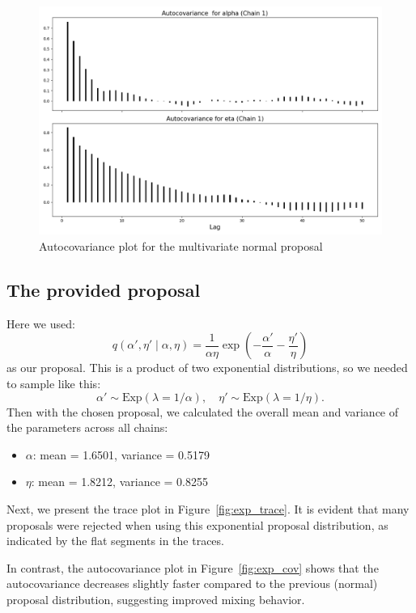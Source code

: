 \documentclass[9pt]{IEEEtran}
\begin{document}
        \begin{figure}[h]
        \centering
        \includegraphics[width=0.99\columnwidth]{figures/mvn_cov.png}
        \caption{Autocovariance plot for the multivariate normal proposal}
        \label{fig:mvn_cov}
    \end{figure}


\subsection{The provided proposal}
Here we used: 
\[
q(\alpha', \eta' \mid \alpha, \eta) = \frac{1}{\alpha \eta} \exp\left( -\frac{\alpha'}{\alpha} - \frac{\eta'}{\eta} \right)
\]
as our proposal. This is a product of two exponential distributions, 
so we needed to sample like this:
\[
\alpha' \sim \text{Exp}(\lambda = 1/\alpha), \quad \eta' \sim \text{Exp}(\lambda = 1/\eta).
\]
Then with the chosen proposal, we calculated the overall mean and variance of the parameters across all chains:

\begin{itemize}
    \item $\alpha$: mean = 1.6501, variance = 0.5179
    \item $\eta$: mean = 1.8212, variance = 0.8255
\end{itemize} 

Next, we present the trace plot in Figure~\ref{fig:exp_trace}. It is evident that many proposals were rejected when using this exponential proposal distribution, as indicated by the flat segments in the traces. 

In contrast, the autocovariance plot in Figure~\ref{fig:exp_cov} shows that the autocovariance decreases slightly faster compared to the previous (normal) proposal distribution, suggesting improved mixing behavior.
\end{document}
